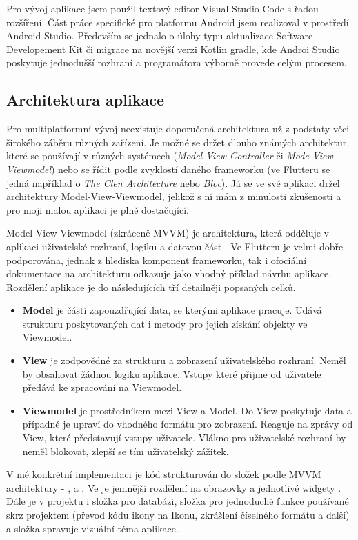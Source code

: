 \documentclass[
  biblatex,
  figures=true,
  tables=false,
  glossaries,
  index
]{kidiplom}
\begin{document}
Pro vývoj aplikace jsem použil textový editor Visual Studio Code s řadou rozšíření. Část práce specifické pro platformu Android jsem realizoval v prostředí Android Studio. Především se jednalo o úlohy typu aktualizace Software Developement Kit či migrace na novější verzi Kotlin gradle, kde Androi Studio poskytuje jednodušší rozhraní a programátora výborně provede celým procesem.

\subsection{Architektura aplikace}
Pro multiplatformní vývoj neexistuje doporučená architektura už z podstaty věci širokého záběru různých zařízení. Je možné se držet dlouho známých architektur, které se používají v různých systémech (\textit{Model-View-Controller} či \textit{Mode-View-Viewmodel}) nebo se řídit podle zvyklostí daného frameworku (ve Flutteru se jedná například o \textit{The Clen Architecture} nebo \textit{Bloc}). Já se ve své aplikaci držel architektury Model-View-Viewmodel, jelikož s ní mám z minulosti zkušenosti a pro moji malou aplikaci je plně dostačující. 

Model-View-Viewmodel (zkráceně MVVM) je architektura, která odděluje v aplikaci uživatelské rozhraní, logiku a datovou část \cite{mvvm}. Ve Flutteru je velmi dobře podporována, jednak z hlediska komponent frameworku, tak i ofociální dokumentace na architekturu odkazuje jako vhodný příklad návrhu aplikace. Rozdělení aplikace je do následujících tří detailněji popsaných celků.
\begin{itemize}
  \item \textbf{Model} je částí zapouzdřující data, se kterými aplikace pracuje. Udává strukturu poskytovaných dat i metody pro jejich získání objekty ve Viewmodel.
  \item \textbf{View} je zodpovědné za strukturu a zobrazení uživatelského rozhraní. Neměl by obsahovat žádnou logiku aplikace. Vstupy které přijme od uživatele předává ke zpracování na Viewmodel. 
  \item \textbf{Viewmodel} je prostředníkem mezi View a Model. Do View poskytuje data a případně je upraví do vhodného formátu pro zobrazení. Reaguje na zprávy od View, které představují vstupy uživatele. Vlákno pro uživatelské rozhraní by neměl blokovat, zlepší se tím uživatelský zážitek.
\end{itemize}

V mé konkrétní implementaci je kód strukturován do složek podle MVVM architektury - ,  a . Ve  je jemnější rozdělení na obrazovky  a jednotlivé widgety . Dále je v projektu i složka  pro databázi, složka  pro jednoduché funkce používané skrz projektem (převod kódu ikony na Ikonu, zkrášlení číselného formátu a další) a složka  spravuje vizuální téma aplikace.
\end{document}
